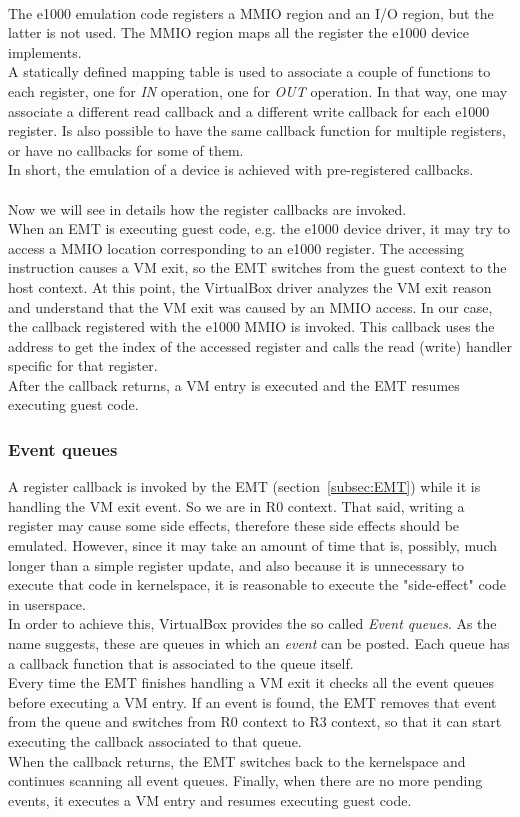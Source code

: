 \documentclass[a4paper, 12pt, titlepage]{report}
\begin{document}
\\
The e1000 emulation code registers a MMIO region and an I/O region, but the latter is not used. The MMIO region maps all the register the e1000 device implements.
\\
A statically defined mapping table is used to associate a couple of functions to each register, one for \textit{IN} operation, one for \textit{OUT} operation. In that way, one may associate a different read callback and a different write callback for each e1000 register. Is also possible to have the same callback function for multiple registers, or have no callbacks for some of them.
\\
In short, the emulation of a device is achieved with pre-registered callbacks.
\\
\\
Now we will see in details how the register callbacks are invoked.
\\
When an EMT is executing guest code, e.g. the e1000 device driver, it may try to access a MMIO location corresponding to an e1000 register. The accessing instruction causes a VM exit, so the EMT switches from the guest context to the host context. At this point, the VirtualBox driver analyzes the VM exit reason and understand that the VM exit was caused by an MMIO access. In our case, the callback registered with the e1000 MMIO is invoked. This callback uses the address to get the index of the accessed register and calls the read (write) handler specific for that register.
\\
After the callback returns, a VM entry is executed and the EMT resumes executing guest code.
\subsubsection{Event queues}
A register callback is invoked by the EMT (section~\ref{subsec:EMT}) while it is handling the VM exit event. So we are in R0 context. That said, writing a register may cause some side effects, therefore these side effects should be emulated. However, since it may take an amount of time that is, possibly, much longer than a simple register update, and also because it is unnecessary to execute that code in kernelspace, it is reasonable to execute the "side-effect" code in userspace.
\\
In order to achieve this, VirtualBox provides the so called \textit{Event queues}. As the name suggests, these are queues in which an \textit{event} can be posted. Each queue has a callback function that is associated to the queue itself.
\\
Every time the EMT finishes handling a VM exit it checks all the event queues before executing a VM entry. If an event is found, the EMT removes that event from the queue and switches from R0 context to R3 context, so that it can start executing the callback associated to that queue. 
\\
When the callback returns, the EMT switches back to the kernelspace and continues scanning all event queues. Finally, when there are no more pending events, it executes a VM entry and resumes executing guest code.
\end{document}
